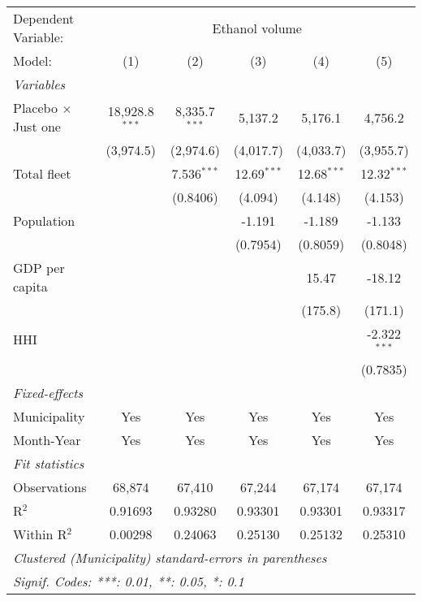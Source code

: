 \documentclass[
]{article}
\begin{document}
\begin{tabular}{lccccc}
\tabularnewline\midrule\midrule
Dependent Variable:&\multicolumn{5}{c}{Ethanol volume}\\
Model:&(1) & (2) & (3) & (4) & (5)\\
\midrule \emph{Variables}&   &   &   &   &  \\
Placebo $\times $ Just one & 18,928.8$^{***}$ & 8,335.7$^{***}$ & 5,137.2 & 5,176.1 & 4,756.2\\
  &(3,974.5) & (2,974.6) & (4,017.7) & (4,033.7) & (3,955.7)\\
Total fleet &    & 7.536$^{***}$ & 12.69$^{***}$ & 12.68$^{***}$ & 12.32$^{***}$\\
  &   & (0.8406) & (4.094) & (4.148) & (4.153)\\
Population &    &    & -1.191 & -1.189 & -1.133\\
  &   &    & (0.7954) & (0.8059) & (0.8048)\\
GDP per capita &    &    &    & 15.47 & -18.12\\
  &   &    &    & (175.8) & (171.1)\\
HHI &    &    &    &    & -2.322$^{***}$\\
  &   &    &    &    & (0.7835)\\
\midrule \emph{Fixed-effects}&   &   &   &   &  \\
Municipality & Yes & Yes & Yes & Yes & Yes\\
Month-Year & Yes & Yes & Yes & Yes & Yes\\
\midrule \emph{Fit statistics}&  & & & & \\
Observations & 68,874&67,410&67,244&67,174&67,174\\
R$^2$ & 0.91693&0.93280&0.93301&0.93301&0.93317\\
Within R$^2$ & 0.00298&0.24063&0.25130&0.25132&0.25310\\
\midrule\midrule\multicolumn{6}{l}{\emph{Clustered (Municipality) standard-errors in parentheses}}\\
\multicolumn{6}{l}{\emph{Signif. Codes: ***: 0.01, **: 0.05, *: 0.1}}\\
\end{tabular}
\end{document}
